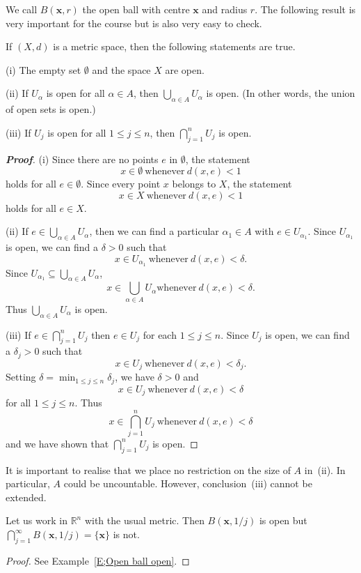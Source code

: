 We call $B({\mathbf x},r)$ the open ball 
with centre ${\mathbf x}$ and radius $r$.
The following result is very important for the course
but is also very easy to check.


\begin{theorem}\label{T;properties metric open} 
If $(X,d)$ is a metric space, 
then the following statements are true.

(i) The empty set $\emptyset$ and the space $X$ are open.

(ii) If $U_{\alpha}$ is open for all $\alpha\in A$, then
$\bigcup_{\alpha\in A} U_{\alpha}$ is open. (In other words,
the union of open sets is open.)

(iii) If $U_{j}$ is open for all $1\leq j\leq n$, then
$\bigcap_{j=1}^{n} U_{j}$ is open.
\end{theorem}
\begin{proof}[\bf Proof]
(i) Since there are no points $e$ in $\emptyset$, the statement
\[x\in \emptyset\ \text{whenever}\ d(x,e)<1\]
holds for all $e\in \emptyset$. Since every point $x$ belongs to $X$,
the statement
\[x\in X\ \text{whenever}\ d(x,e)<1\]
holds for all $e\in X$.

(ii) If $e\in \bigcup_{\alpha\in A} U_{\alpha}$, then we can find
a particular $\alpha_{1}\in A$ with $e\in U_{\alpha_{1}}$.
Since $U_{\alpha_{1}}$ is open, we can find a $\delta>0$
such that
\[x\in U_{\alpha_{1}}\ \text{whenever}\ d(x,e)<\delta.\]
Since $U_{\alpha_{1}}\subseteq \bigcup_{\alpha\in A} U_{\alpha}$,
\[x\in \bigcup_{\alpha\in A} U_{\alpha}  \text{whenever}\ d(x,e)<\delta.\]
Thus $\bigcup_{\alpha\in A} U_{\alpha}$ is open.

(iii) If $e\in \bigcap_{j=1}^{n} U_{j}$ then
$e\in U_{j}$ for each $1\leq j\leq n$. Since
$U_{j}$ is open, we can find a $\delta_{j}>0$
such that
\[x\in U_{j}\ \text{whenever}\ d(x,e)<\delta_{j}.\]
Setting $\delta=\min_{1\leq j\leq n}\delta_{j}$, we
have $\delta>0$ and
\[x\in U_{j}\ \text{whenever}\ d(x,e)<\delta\]
for all $1\leq j\leq n $. Thus
\[x\in \bigcap_{j=1}^{n} U_{j}\ \text{whenever}\ d(x,e)<\delta\]
and we have shown that $\bigcap_{j=1}^{n} U_{j}$ is open.
\end{proof} 


It is important to realise that we place no restriction on the size of $A$ in~(ii). In particular, $A$ could be uncountable. However, conclusion~(iii) cannot be extended.

\begin{example}\label{E;countable intersection open}
Let us work in ${\mathbb R}^{n}$ with the usual metric.
Then $B({\mathbf x},1/j)$ is open but
$\bigcap_{j=1}^{\infty}B({\mathbf x},1/j)=\{{\mathbf x}\}$ is not.
\end{example}
\begin{proof} See Example~\ref{E;Open ball open}.\end{proof}

